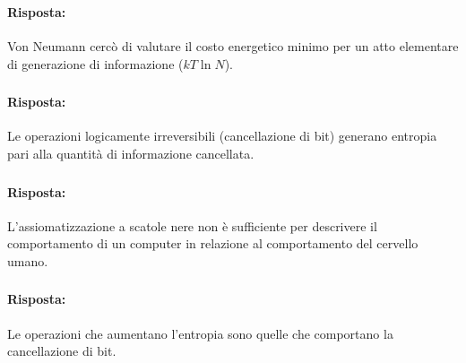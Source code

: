 \subsubsection{}


\paragraph{Risposta:} Von Neumann cercò di valutare il costo energetico minimo 
per un atto elementare di generazione di informazione ($kT \ln N$).

\subsubsection{}


\paragraph{Risposta:} Le operazioni logicamente irreversibili (cancellazione di bit) 
generano entropia pari alla quantità di informazione cancellata.

\subsubsection{}


\paragraph{Risposta:} L'assiomatizzazione a scatole nere non è sufficiente per descrivere
il comportamento di un computer in relazione al comportamento del cervello umano.

\subsubsection{}


\paragraph{Risposta:} Le operazioni che aumentano l'entropia sono quelle che comportano la cancellazione di bit.


